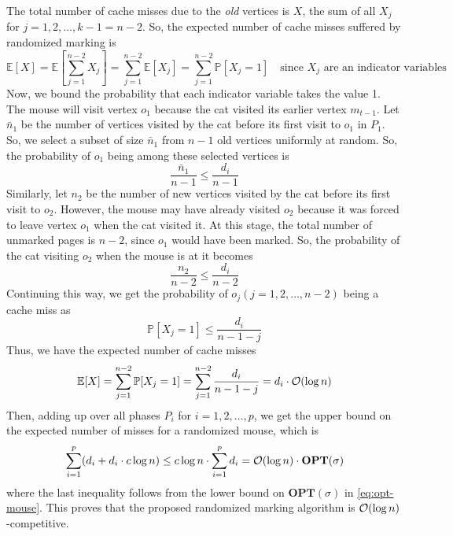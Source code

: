 \documentclass[11pt]{article}
\newcommand{\bigO}{{\cal O}}
\begin{document}
The total number of cache misses due to the \textit{old} vertices is $X$, the sum of all
$X_{j}$ for $j = 1, 2, \ldots, k-1=n-2$. So, the expected number of cache misses suffered by randomized marking is
\begin{equation}
    \mathbb{E}[X] = \mathbb{E} \left[ \sum_{j=1}^{n-2} X_{j} \right] = \sum_{j=1}^{n-2} \mathbb{E}[X_{j}]
    = \sum_{j=1}^{n-2} \mathbb{P}[X_{j} = 1] \quad \text{since } X_{j} \text{ are an indicator variables}
\end{equation}
Now, we bound the probability that each indicator variable takes the value 1. The mouse
will visit vertex $o_{1}$ because the cat visited its earlier vertex $m_{t-1}$. Let $\bar{n}_{1}$
be the number of vertices visited by the cat before its first visit to $o_{1}$ in $P_{1}$.
So, we select a subset of size $\bar{n}_{1}$ from $n-1$ old vertices uniformly at random.
So, the probability of $o_{1}$ being among these selected vertices is
\begin{equation}
    \frac{\bar{n}_{1}}{n-1} \leq \frac{d_{i}}{n-1}
\end{equation}
Similarly, let $n_{2}$ be the number of new vertices visited by the cat before its first visit to
$o_{2}$. However, the mouse may have already visited $o_{2}$ because it was forced to leave
vertex $o_{1}$ when the cat visited it. At this stage, the total number of unmarked pages is $n-2$,
since $o_{1}$ would have been marked. So, the probability of the cat visiting $o_{2}$ when the mouse
is at it becomes
\begin{equation}
    \frac{n_{2}}{n-2} \leq \frac{d_{i}}{n-2}
\end{equation}
Continuing this way, we get the probability of $o_{j} (j = 1, 2, \ldots, n-2)$ being a cache miss as
\begin{equation}
    \mathbb{P}[X_{j} = 1] \leq \frac{d_{i}}{n-1-j}
\end{equation}
Thus, we have the expected number of cache misses
\begin{equation}
    \mathbb{E}[X] = \sum_{j=1}^{n-2} \mathbb{P}[X_{j} = 1] = \sum_{j=1}^{n-2} \frac{d_{i}}{n-1-j}
    = d_{i} \cdot \bigO(\log{n})
\end{equation}
Then, adding up over all phases $P_{i}$ for $i = 1, 2, \ldots, p$, we get the upper bound on the
expected number of misses for a randomized mouse, which is
\begin{equation}
    \sum_{i=1}^{p}(d_{i} + d_{i} \cdot c \log{n}) \leq c \log{n} \cdot \sum_{i=1}^{p} d_{i} = \bigO(\log{n}) \cdot \mathbf{OPT}(\sigma)
\end{equation}
where the last inequality follows from the lower bound on $\mathbf{OPT}(\sigma)$ in \eqref{eq:opt-mouse}.
This proves that the proposed randomized marking algorithm is $\bigO(\log{n})$-competitive.
\end{document}
